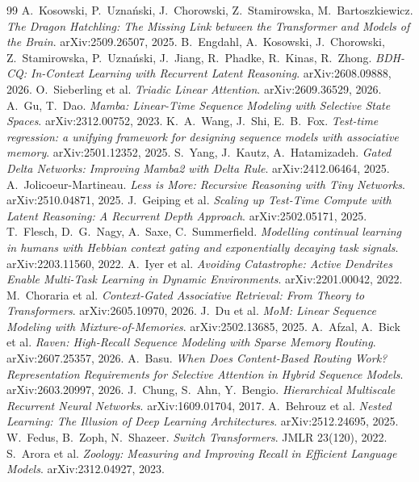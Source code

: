 \documentclass[11pt]{article}
\begin{document}
\begin{thebibliography}{99}
\small
{} A.~Kosowski, P.~Uzna\'nski, J.~Chorowski, Z.~Stamirowska, M.~Bartoszkiewicz. \emph{The Dragon Hatchling: The Missing Link between the Transformer and Models of the Brain}. arXiv:2509.26507, 2025.
 B.~Engdahl, A.~Kosowski, J.~Chorowski, Z.~Stamirowska, P.~Uzna\'nski, J.~Jiang, R.~Phadke, R.~Kinas, R.~Zhong. \emph{BDH-CQ: In-Context Learning with Recurrent Latent Reasoning}. arXiv:2608.09888, 2026.
 O.~Sieberling et al. \emph{Triadic Linear Attention}. arXiv:2609.36529, 2026.
 A.~Gu, T.~Dao. \emph{Mamba: Linear-Time Sequence Modeling with Selective State Spaces}. arXiv:2312.00752, 2023.
 K.~A.~Wang, J.~Shi, E.~B.~Fox. \emph{Test-time regression: a unifying framework for designing sequence models with associative memory}. arXiv:2501.12352, 2025.
 S.~Yang, J.~Kautz, A.~Hatamizadeh. \emph{Gated Delta Networks: Improving Mamba2 with Delta Rule}. arXiv:2412.06464, 2025.
 A.~Jolicoeur-Martineau. \emph{Less is More: Recursive Reasoning with Tiny Networks}. arXiv:2510.04871, 2025.
 J.~Geiping et al. \emph{Scaling up Test-Time Compute with Latent Reasoning: A Recurrent Depth Approach}. arXiv:2502.05171, 2025.
 T.~Flesch, D.~G.~Nagy, A.~Saxe, C.~Summerfield. \emph{Modelling continual learning in humans with Hebbian context gating and exponentially decaying task signals}. arXiv:2203.11560, 2022.
 A.~Iyer et al. \emph{Avoiding Catastrophe: Active Dendrites Enable Multi-Task Learning in Dynamic Environments}. arXiv:2201.00042, 2022.
 M.~Choraria et al. \emph{Context-Gated Associative Retrieval: From Theory to Transformers}. arXiv:2605.10970, 2026.
 J.~Du et al. \emph{MoM: Linear Sequence Modeling with Mixture-of-Memories}. arXiv:2502.13685, 2025.
 A.~Afzal, A.~Bick et al. \emph{Raven: High-Recall Sequence Modeling with Sparse Memory Routing}. arXiv:2607.25357, 2026.
 A.~Basu. \emph{When Does Content-Based Routing Work? Representation Requirements for Selective Attention in Hybrid Sequence Models}. arXiv:2603.20997, 2026.
 J.~Chung, S.~Ahn, Y.~Bengio. \emph{Hierarchical Multiscale Recurrent Neural Networks}. arXiv:1609.01704, 2017.
 A.~Behrouz et al. \emph{Nested Learning: The Illusion of Deep Learning Architectures}. arXiv:2512.24695, 2025.
 W.~Fedus, B.~Zoph, N.~Shazeer. \emph{Switch Transformers}. JMLR 23(120), 2022.
 S.~Arora et al. \emph{Zoology: Measuring and Improving Recall in Efficient Language Models}. arXiv:2312.04927, 2023.
\end{thebibliography}
\end{document}
